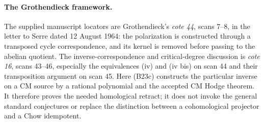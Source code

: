 \paragraph{The Grothendieck framework.}
The supplied manuscript locators are
Grothendieck's \emph{cote 44}, scans 7--8, in the letter
to Serre dated 12 August 1964: the polarization is
constructed through a transposed cycle correspondence,
and its kernel is removed before passing to the abelian
quotient.  The inverse-correspondence and critical-degree
discussion is \emph{cote 16}, scans 43--46, especially
the equivalences (iv) and (iv bis) on scan 44 and
their transposition argument on scan 45.  Here (B23c)
constructs the particular inverse on a CM source by a
rational polynomial and the accepted CM Hodge theorem.
It therefore proves the needed homological retract;
it does not invoke the general standard conjectures
or replace the distinction between a cohomological
projector and a Chow idempotent.
